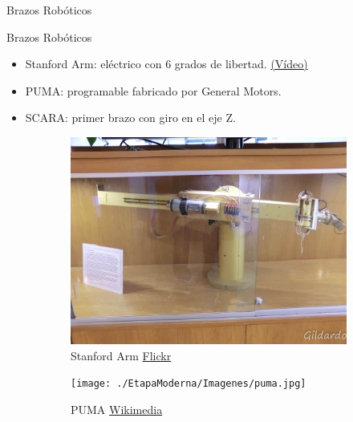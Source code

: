 \begin{frame}[fragile]{Brazos Robóticos}
\vspace{10px}
\pause
{}
\begin{block}{Brazos Robóticos}
	\begin{itemize}
		\item Stanford Arm: eléctrico con 6 grados de libertad. \href{https://www.youtube.com/watch?v=r4aNOM3IK7A}{(Vídeo)}
		\pause
		\item PUMA: programable fabricado por General Motors.
		\pause
		\item SCARA: primer brazo con giro en el eje Z.
	\end{itemize}
\end{block}
\begin{figure}
	\centering
	\pause
	\begin{subfigure}{0.33\textwidth}
		\centering
		\includegraphics[scale=0.08]{./EtapaModerna/Imagenes/stanford_arm.jpg}
		\caption{Stanford Arm \href{https://www.flickr.com/photos/gildardo/6186967797}{Flickr}}
	\end{subfigure}
	\pause
	\begin{subfigure}{0.32\textwidth}
		\centering
		\texttt{[image: ./EtapaModerna/Imagenes/puma.jpg]}
		\caption{PUMA \href{https://es.m.wikipedia.org/wiki/Archivo:Puma_Robotic_Arm_-_GPN-2000-001817.jpg}{Wikimedia}}
	\end{subfigure}
	\pause
	\begin{subfigure}{0.33\textwidth}
		\centering

\end{subfigure}
\end{figure}
\end{frame}
